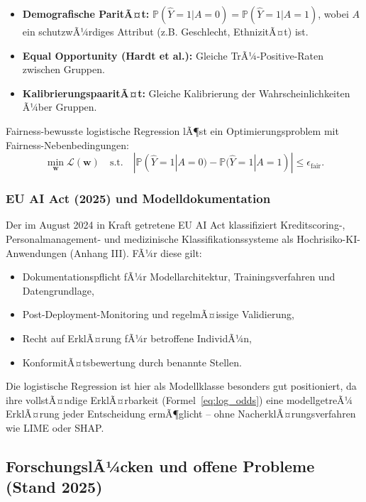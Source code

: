 ﻿\documentclass[12pt, a4paper]{article}
\theoremstyle{definition}
\theoremstyle{remark}
\newcommand{\Prob}{\mathbb{P}}
\newcommand{\vw}{\bm{w}}
\begin{document}
\begin{itemize}
  \item \textbf{Demografische ParitÃ¤t:} $\Prob(\hat{Y}=1|A=0) = \Prob(\hat{Y}=1|A=1)$, wobei $A$ ein schutzwÃ¼rdiges Attribut (z.B. Geschlecht, EthnizitÃ¤t) ist.
  \item \textbf{Equal Opportunity (Hardt et al.):} Gleiche TrÃ¼-Positive-Raten zwischen Gruppen.
  \item \textbf{KalibrierungspaaritÃ¤t:} Gleiche Kalibrierung der Wahrscheinlichkeiten Ã¼ber Gruppen.
\end{itemize}

Fairness-bewusste logistische Regression lÃ¶st ein Optimierungsproblem mit Fairness-Nebenbedingungen:
\begin{equation}
  \min_{\vw} \mathcal{L}(\vw) \quad \text{s.t.} \quad |\Prob(\hat{Y}=1|A=0) - \Prob(\hat{Y}=1|A=1)| \leq \epsilon_{\mathrm{fair}}.
\end{equation}

\subsubsection{EU AI Act (2025) und Modelldokumentation}

Der im August 2024 in Kraft getretene EU AI Act klassifiziert Kreditscoring-, Personal\-management-
und medizinische Klassifikationssysteme als Hochrisiko-KI-Anwendungen (Anhang III). FÃ¼r diese
gilt:
\begin{itemize}
  \item Dokumentationspflicht fÃ¼r Modellarchitektur, Trainingsverfahren und Datengrundlage,
  \item Post-Deployment-Monitoring und regelmÃ¤issige Validierung,
  \item Recht auf ErklÃ¤rung fÃ¼r betroffene IndividÃ¼n,
  \item KonformitÃ¤tsbewertung durch benannte Stellen.
\end{itemize}

Die logistische Regression ist hier als Modellklasse besonders gut positioniert, da ihre
vollstÃ¤ndige ErklÃ¤rbarkeit (Formel~\eqref{eq:log_odds}) eine modellgetreÃ¼ ErklÃ¤rung
jeder Entscheidung ermÃ¶glicht -- ohne NacherklÃ¤rungsverfahren wie LIME oder SHAP.

\subsection{ForschungslÃ¼cken und offene Probleme (Stand 2025)}
\end{document}
